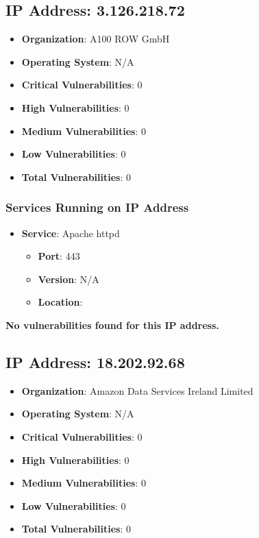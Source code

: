 \documentclass{article}
\begin{document}
\clearpage



\subsection*{IP Address: 3.126.218.72}

\begin{itemize}
    \item \textbf{Organization}: A100 ROW GmbH
    \item \textbf{Operating System}:  N/A 
    \item \textbf{Critical Vulnerabilities}: 0
    \item \textbf{High Vulnerabilities}: 0
    \item \textbf{Medium Vulnerabilities}: 0
    \item \textbf{Low Vulnerabilities}: 0
    \item \textbf{Total Vulnerabilities}: 0
\end{itemize}

\subsubsection*{Services Running on IP Address}

\begin{itemize}
    
        \item \textbf{Service}: Apache httpd
        \begin{itemize}
            \item \textbf{Port}: 443
            \item \textbf{Version}:  N/A 
            \item \textbf{Location}: \href{  }{  }
        \end{itemize}
    
\end{itemize}


\textbf{No vulnerabilities found for this IP address.}




\clearpage



\subsection*{IP Address: 18.202.92.68}

\begin{itemize}
    \item \textbf{Organization}: Amazon Data Services Ireland Limited
    \item \textbf{Operating System}:  N/A 
    \item \textbf{Critical Vulnerabilities}: 0
    \item \textbf{High Vulnerabilities}: 0
    \item \textbf{Medium Vulnerabilities}: 0
    \item \textbf{Low Vulnerabilities}: 0
    \item \textbf{Total Vulnerabilities}: 0
\end{itemize}
\end{document}
